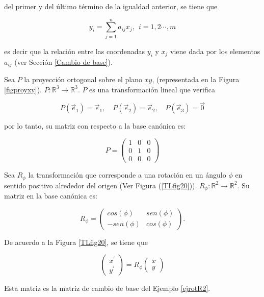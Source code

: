 \bigskip

\noindent
del primer  y del último término de la igualdad anterior, se tiene que  



$$y_{i}=\sum_{j=1}^{n}a_{ij}x_{j},~~ i=1,2 \cdots,m$$

\noindent
es decir que  la relación  entre las coordenadas $y_i$ y $x_j$ viene dada por los elementos $a_{ij}$ (ver Sección \ref{Cambio de base}).

\bigskip

\bigskip

\begin{example}
\label{proyxy}
Sea $P$ la proyección ortogonal sobre el plano $xy$, (representada en la Figura \ref{figproyxy}). $P:\mathbb{R}^3 \rightarrow \mathbb{R}^3$. $P$ es una transformación lineal que verifica 

$$ P(\vec{e}_1)=\vec{e}_1, \quad P(\vec{e}_2)=\vec{e}_2, \quad P(\vec{e}_3)=  \vec{0}$$

\noindent
por lo tanto, su matriz con respecto a la base canónica es: 

$$P=\left(\begin{array}{ccc} 1 & 0 &  0\\
0 &  1  &  0\\
0 &  0  &  0
\end{array}\right)$$
\end{example}

\begin{example}
\label{mrotacion}
Sea $ R_{\phi}$ la transformación que corresponde a una rotación en un ángulo $ \phi$ en sentido positivo  alrededor del origen (Ver Figura (\ref{TLfig20})).  $ R_{\phi}:\mathbb{R}^2 \rightarrow \mathbb{R}^2$.
Su matriz en la base canónica es:

\begin{equation} \label{rot}
R_{\phi}=\left( \begin{array} {cc} 
                     cos(\phi) & sen(\phi)   \\
                     -sen(\phi) & cos(\phi)
				\end{array}
           \right).
\end{equation}
\bigskip

De acuerdo a la Figura \ref{TLfig20}, se tiene que



$$ \left(  \begin{array}{c} x^{\prime} \\ y^{\prime} \end{array}    \right)  = R_{\phi} \left(  \begin{array}{c} x \\ y \end{array}    \right)$$


\bigskip

Esta matriz es la matriz de cambio de base del  Ejemplo \ref{ejrotR2}.

\end{example}

